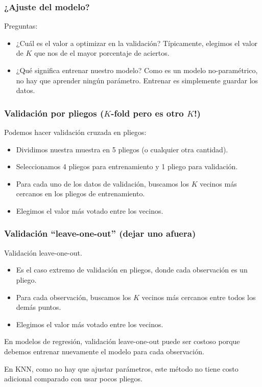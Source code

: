 \documentclass[aspectratio=169,12pt]{beamer}
\begin{document}
\begin{frame}
\frametitle{¿Ajuste del modelo?}

Preguntas:
\begin{itemize}
\item ¿Cuál es el valor a optimizar en la validación? Típicamente, elegimos el valor de $K$ que nos de el mayor porcentaje de aciertos.
\item ¿Qué significa entrenar nuestro modelo? Como es un modelo no-paramétrico, no hay que aprender ningún parámetro. Entrenar es simplemente guardar los datos.
\end{itemize}

\end{frame}

\begin{frame}
\frametitle{Validación por pliegos ($K$-fold pero es otro $K$!)}

Podemos hacer validación cruzada en pliegos:

\begin{itemize}
\item Dividimos nuestra muestra en 5 pliegos (o cualquier otra cantidad).
\item Seleccionamos 4 pliegos para entrenamiento y 1 pliego para validación.
\item Para cada uno de los datos de validación, buscamos los $K$ vecinos más cercanos en los pliegos de entrenamiento.
\item Elegimos el valor más votado entre los vecinos.
\end{itemize}

\end{frame}

\begin{frame}
\frametitle{Validación ``leave-one-out'' (dejar uno afuera)}

Validación leave-one-out.
\begin{itemize}
\item Es el caso extremo de validación en pliegos, donde cada observación es un pliego.
\item Para cada observación, buscamos los $K$ vecinos más cercanos entre todos los demás puntos.
\item Elegimos el valor más votado entre los vecinos.
\end{itemize}

En modelos de regresión, validación leave-one-out puede ser costoso porque debemos entrenar nuevamente el modelo para cada observación. 

En KNN, como no hay que ajustar parámetros, este método no tiene costo adicional comparado con usar pocos pliegos.

\end{frame}
\end{document}
